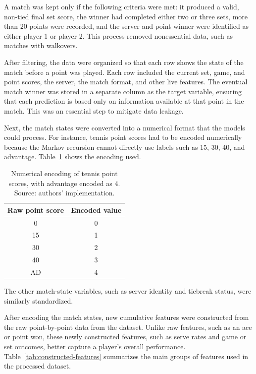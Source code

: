\documentclass[10pt,twocolumn]{article}
\begin{document}
A match was kept only if the following criteria were met: it produced a valid, non-tied final set score, the winner had completed either two or three sets, more than 20 points were recorded, and the server and point winner were identified as either player 1 or player 2. This process removed nonessential data, such as matches with walkovers.

After filtering, the data were organized so that each row shows the state of the match before a point was played. Each row included the current set, game, and point scores, the server, the match format, and other live features. The eventual match winner was stored in a separate column as the target variable, ensuring that each prediction is based only on information available at that point in the match. This was an essential step to mitigate data leakage.

Next, the match states were converted into a numerical format that the models could process. For instance, tennis point scores had to be encoded numerically because the Markov recursion cannot directly use labels such as 15, 30, 40, and advantage. Table~\ref{tab:score-encoding} shows the encoding used.

\begin{table}[H]
\centering
\caption{Numerical encoding of tennis point scores, with advantage encoded as 4. Source: authors' implementation.\cite{xie2026}}
\label{tab:score-encoding}
\begin{tabular}{cc}
\toprule
\textbf{Raw point score} & \textbf{Encoded value} \\
\midrule
0 & 0 \\
15 & 1 \\
30 & 2 \\
40 & 3 \\
AD & 4 \\
\bottomrule
\end{tabular}
\end{table}

The other match-state variables, such as server identity and tiebreak status, were similarly standardized.

After encoding the match states, new cumulative features were constructed from the raw point-by-point data from the dataset. Unlike raw features, such as an ace or point won, these newly constructed features, such as serve rates and game or set outcomes, better capture a player's overall performance. Table~\ref{tab:constructed-features} summarizes the main groups of features used in the processed dataset.
\end{document}
